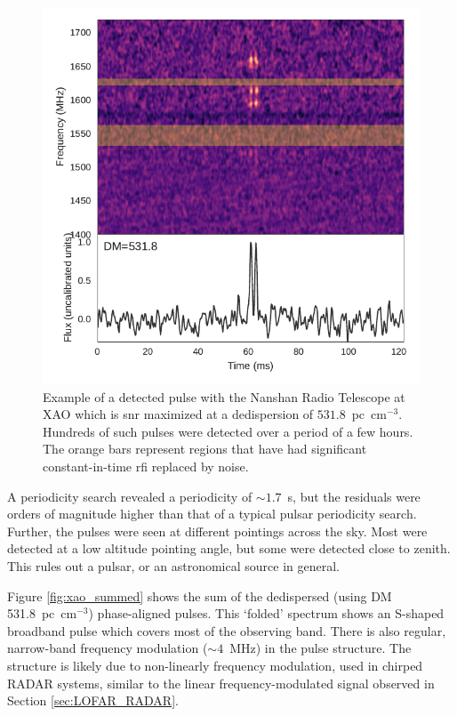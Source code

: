 \documentclass[a4paper,fleqn,usenatbib]{mnras}
\begin{document}
\begin{figure}
    \includegraphics[width=1.0\linewidth]{figures/XAO_pulse_dynamic.pdf}
    \caption{Example of a detected pulse with the Nanshan Radio Telescope at XAO
    which is \gls{snr} maximized at a dedispersion of $531.8$~pc~cm$^{-3}$.
    Hundreds of such pulses were detected over a period of a few hours. The
    orange bars represent regions that have had significant constant-in-time
    \gls{rfi} replaced by noise.
    }
    \label{fig:xao_dynamic}
\end{figure}

A periodicity search revealed a periodicity of $\sim 1.7$~s, but the residuals
were orders of magnitude higher than that of a typical pulsar periodicity
search.  Further, the pulses were seen at different pointings across the sky.
Most were detected at a low altitude pointing angle, but some were detected
close to zenith.  This rules out a pulsar, or an astronomical source in general.

Figure \ref{fig:xao_summed} shows the sum of the dedispersed (using DM
531.8~pc~cm$^{-3}$) phase-aligned pulses.  This `folded' spectrum shows an
S-shaped broadband pulse which covers most of the observing band. There is also
regular, narrow-band frequency modulation ($\sim4$~MHz) in the pulse structure.
The structure is likely due to non-linearly frequency modulation, used in
chirped RADAR systems, similar to the linear frequency-modulated signal observed
in Section \ref{sec:LOFAR_RADAR}.
\end{document}
